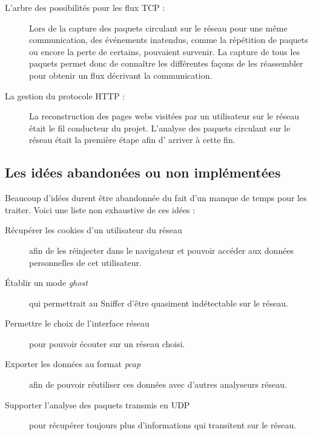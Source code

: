 \begin{description}
\item[L'arbre des possibilités pour les flux TCP :] Lors de la capture des paquets circulant sur le réseau pour une même communication, des événements inatendus, comme la répétition de paquets ou encore la perte de certains,  pouvaient survenir. La capture de tous les paquets permet donc de connaître les différentes façons de les réassembler pour obtenir un flux décrivant la communication. 
\item[La gestion du protocole HTTP :] La reconstruction des pages webs visitées par un utilisateur sur le réseau était le fil conducteur du projet. L'analyse des paquets circulant sur le réseau était la première étape afin d' arriver à cette fin.\\
\end{description}

\subsection{Les idées abandonées ou non implémentées}
Beaucoup d'idées durent être abandonnée du fait d'un manque de temps pour les traiter. Voici une liste non exhaustive de ces idées :
\begin{description}
  \item[Récupérer les cookies d'un utilisateur du réseau] afin de les réinjecter dans le navigateur et pouvoir accéder aux données personnelles de cet utilisateur.
  \item[Établir un mode \emph{ghost}] qui permettrait au Sniffer d'être quasiment indétectable sur le réseau. 
  \item[Permettre le choix de l'interface réseau] pour pouvoir écouter sur un réseau choisi.  
  \item[Exporter les données au format \emph{pcap}] afin de pouvoir réutiliser ces données avec d'autres analyseurs réseau.
  \item[Supporter l'analyse des paquets transmis en UDP] pour récupérer toujours plus d'informations qui transitent sur le réseau.
\end{description}
